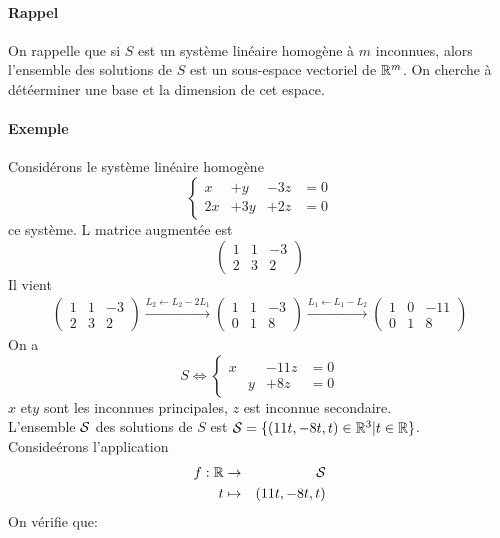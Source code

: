 \paragraph{Rappel} On rappelle que si $S$ est un système linéaire homogène à $m$ inconnues, alors l'ensemble des solutions de $S$ est un sous-espace vectoriel de $\mathbb{R}^m$. On cherche à détéerminer une base et la dimension de cet espace.

\paragraph{Exemple} Considérons le système linéaire homogène
$$\left\{\begin{array}{cccc}
   x & + y & -3z & = 0 \\
  2x & +3y & +2z & = 0
\end{array}\right. $$
ce système. L matrice augmentée est
$$\begin{pmatrix}
 1 & 1 & -3 \\
 2 & 3 & 2
\end{pmatrix}$$
Il vient
\begin{eqnarray*}
  \begin{pmatrix} 
    1 & 1 &-3 \\ 
    2 &3 & 2
  \end{pmatrix} 
  \xrightarrow{L_2 \leftarrow L_2 - 2L_1}
  \begin{pmatrix}
    1 & 1 &-3 \\ 
    0 & 1 & 8
  \end{pmatrix} 
  \xrightarrow{L_1 \leftarrow L_1 - L_2}
  \begin{pmatrix} 
    1 & 0 & -11 \\ 
    0 & 1 & 8
  \end{pmatrix}
\end{eqnarray*}
On a 
$$S \Leftrightarrow \left\{\begin{array}{cccc} x & & -11 z & = 0 \\ & y & +8 z & = 0 \end{array} \right.$$
$x$ et$y$ sont les inconnues principales, $z$ est inconnue secondaire. \\
L'ensemble $\mathcal{S}$ des solutions de $S$ est $\mathcal{S} = \{(11t, -8t, t) \in \mathbb{R}^3 \vert t \in \mathbb{R} \}$.\\
Consideérons l'application
\begin{eqnarray*}
  f: \mathbb{R} &\rightarrow& \mathcal{S} \\
  t &\mapsto & (11t, -8t, t)
\end{eqnarray*}
On vérifie que:
